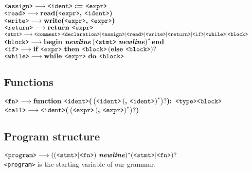 \documentclass[a4paper,12pt,notitlepage,english]{article}
\begin{document}
  \(\verb+<assign>+ \longrightarrow \verb+<ident>+ \text{ \bfseries := } \verb+<expr>+\)\\
  \(\verb+<read>+ \longrightarrow \text{\bfseries read(}\verb+<expr>+\text{\bfseries , }\verb+<ident>+\text{\bfseries )}\)\\
  \(\verb+<write>+ \longrightarrow \text{\bfseries write(}\verb+<expr>+\text{\bfseries , }\verb+<expr>+\text{\bfseries )}\)\\
  \(\verb+<return>+ \longrightarrow \text{\bfseries return }\verb+<expr>+\)\\
  \(\verb+<stmt>+ \longrightarrow \verb+<comment>+ | \verb+<declaration>+ | \verb+<assign>+ | \verb+<read>+ | \verb+<write>+ | \verb+<return>+ | \verb+<if>+ | \verb+<while>+ | \verb+<block>+\)\\
  \(\verb+<block>+ \longrightarrow \text{\bfseries begin \emph{newline}} \left(\verb+<stmt>+ \text{ \bfseries\emph{newline}}\right)^* \text{\bfseries end}\)\\
  \(\verb+<if>+ \longrightarrow \text{\bfseries if } \verb+<expr>+ \text{ \bfseries then } \verb+<block>+ \left(\text{\bfseries else } \verb+<block>+\right)?\)\\
  \(\verb+<while>+ \longrightarrow \text{\bfseries while } \verb+<expr>+ \text{ \bfseries do } \verb+<block>+\)

  \subsection{Functions}

  \(\verb+<fn>+ \longrightarrow \text{\bfseries function } \verb+<ident>+\text{\bfseries (}\left(\verb+<ident>+\left(\text{\bfseries , } \verb+<ident>+\right)^*\right)?\text{\bfseries )}\text{\bfseries : } \verb+<type>+ \verb+<block>+\)\\
  \(\verb+<call>+ \longrightarrow \verb+<ident>+\text{\bfseries (}\left(\verb+<expr>+\left(\text{\bfseries , } \verb+<expr>+\right)^*\right)?\text{\bfseries )}\)

  \subsection{Program structure}

  \(\verb+<program>+ \longrightarrow ((\verb+<stmt>+ | \verb+<fn>+)\text{ \bfseries\emph{newline}})^*(\verb+<stmt>+ | \verb+<fn>+)?\)\\

  \noindent\verb+<program>+ is the starting variable of our grammar.
\end{document}
